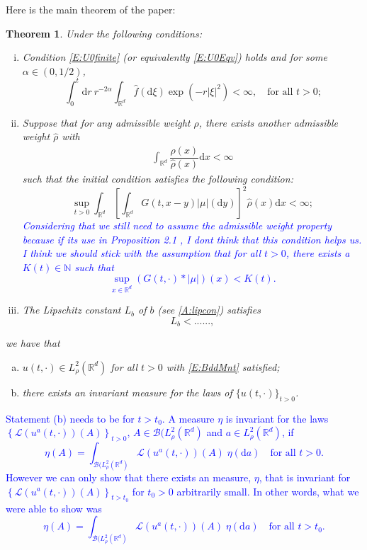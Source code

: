 \documentclass[a4paper,11pt]{article}%
\numberwithin{equation}{section}
\theoremstyle{plain}
\newtheorem{theorem}{Theorem}[section]
\theoremstyle{definition}
\newcommand{\R}{\mathbb{R}}
\newcommand{\ud}{\ensuremath{ \mathrm{d} }}
\begin{document}
Here is the main theorem of the paper:

\begin{theorem}
	\label{T:Main}
	Under the following conditions:
	\begin{enumerate}[(i)]
		\item  Condition \eqref{E:U0finite} (or equivalently \eqref{E:U0Eqv}) holds and for some
			$\alpha\in (0,1/2)$,
			\begin{equation}
				\label{A:fcon}
				\int_0^t \ud r \: r^{-2\alpha} \int_{\R^{d}} \widehat{f}(\ud \xi) \exp\left(-r|\xi|^2 \right) < \infty,
				\quad \text{for all $t>0$;}
			\end{equation}
		\item Suppose that for any admissible weight $\rho$, there exists another admissible weight
			$\widehat{\rho}$ with
			\begin{align}
				\label{E:rhorho}
				\int_{\R^d}\dfrac{\rho(x)}{\widehat{\rho}(x)}\ud x < \infty
			\end{align}
			such that the initial condition satisfies the following condition:
			\begin{equation}
				\label{E:InitData}
				\sup_{t>0} \int_{\R^d} \left[\int_{\R^d} G(t,x-y)|\mu|(\ud y)\right]^2 \widehat{\rho}(x) \ud x <\infty;
			\end{equation}
\textcolor{blue}{Considering that we still need to assume the admissible weight property because if its use in Proposition 2.1 \cite{TZ98}, I dont think that this condition helps us. I think we should stick with the assumption that for all $t>0$, there exists a $K(t) \in \mathbb{N}$ such that
	\[
		\sup_{x\in \R^d} (G(t,\cdot)*|\mu|)(x) < K(t).
	\]}
		\item The Lipschitz constant $L_b$ of $b$ (see \eqref{A:lipcon}) satisfies
			\begin{equation}
				\label{E:LipLb}
			  L_b < ......,
			\end{equation}
	\end{enumerate}
	we have that
	\begin{enumerate}[(a)]
		\item $u(t,\cdot)\in L_\rho^2(\R^d)$ for all $t>0$ with \eqref{E:BddMnt} satisfied;
		\item there exists an invariant measure for the laws of $\{u(t,\cdot)\}_{t>0}$.
	\end{enumerate}
\end{theorem}

	\textcolor{blue}{Statement (b) needs to be for $t> t_0$. A measure $\eta$ is invariant for the laws $\left\{ \mathcal{L}(u^a(t,\cdot))(A) \right\}_{t > 0}$, $A \in \mathscr{B}(L^2_\rho(\R^d)$ and $a \in L^2_\rho(\R^d)$, if 
		\[
			\eta(A) = \int_{\mathscr{B}(L^2_\rho(\R^d)} \mathcal{L}(u^a(t,\cdot))(A) \; \eta(\ud a) \quad \text{for all } t>0.
		\]
However we can only show that there exists an measure, $\eta$, that is invariant for $\left\{ \mathcal{L}(u^a(t,\cdot))(A) \right\}_{t > t_0}$ for $t_0>0$ arbitrarily small. In other words, what we were able to show was 
	\[
	\eta(A) = \int_{\mathscr{B}(L^2_\rho(\R^d)} \mathcal{L}(u^a(t,\cdot))(A) \; \eta(\ud a) \quad \text{for all } t>t_0.
	\]
}
\newpage
\end{document}
